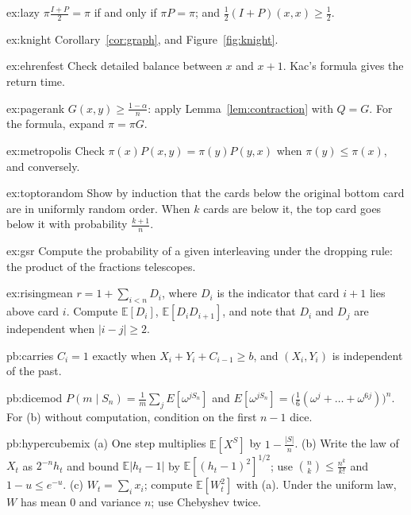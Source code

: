 \begin{hint}{ex:lazy}
$\pi\frac{I+P}2=\pi$ if and only if $\pi P=\pi$; and $\frac12(I+P)(x,x)\ge\frac12$.
\end{hint}
\begin{hint}{ex:knight}
Corollary~\ref{cor:graph}, and Figure~\ref{fig:knight}.
\end{hint}
\begin{hint}{ex:ehrenfest}
Check detailed balance between $x$ and $x+1$. Kac's formula gives the return time.
\end{hint}
\begin{hint}{ex:pagerank}
$G(x,y)\ge\frac{1-\alpha}n$: apply Lemma~\ref{lem:contraction} with $Q=G$. For the formula, expand $\pi=\pi G$.
\end{hint}
\begin{hint}{ex:metropolis}
Check $\pi(x)P(x,y)=\pi(y)P(y,x)$ when $\pi(y)\le\pi(x)$, and conversely.
\end{hint}
\begin{hint}{ex:toptorandom}
Show by induction that the cards below the original bottom card are in uniformly random order. When $k$ cards are below
it, the top card goes below it with probability $\frac{k+1}n$.
\end{hint}
\begin{hint}{ex:gsr}
Compute the probability of a given interleaving under the dropping rule: the product of the fractions telescopes.
\end{hint}
\begin{hint}{ex:risingmean}
$r=1+\sum_{i<n}D_i$, where $D_i$ is the indicator that card $i+1$ lies above card $i$. Compute $\mathbb E[D_i]$, $\mathbb E[D_iD_{i+1}]$, and note that $D_i$ and $D_j$ are
independent when $|i-j|\ge2$.
\end{hint}

\begin{hint}{pb:carries}
$C_i=1$ exactly when $X_i+Y_i+C_{i-1}\ge b$, and $(X_i,Y_i)$ is independent of the past.
\end{hint}

\begin{hint}{pb:dicemod}
$P(m\mid S_n)=\frac1m\sum_{j}E[\omega^{jS_n}]$ and $E[\omega^{jS_n}]=\bigl(\frac16(\omega^j+\dots+\omega^{6j})\bigr)^n$. For
(b) without computation, condition on the first $n-1$ dice.
\end{hint}

\begin{hint}{pb:hypercubemix}
(a) One step multiplies $\mathbb E[X^S]$ by $1-\frac{|S|}n$. (b) Write the law of $X_t$ as $2^{-n}h_t$ and bound $\mathbb E|h_t-1|$ by $\mathbb E[(h_t-1)^2]^{1/2}$; use
$\binom nk\le\frac{n^k}{k!}$ and $1-u\le e^{-u}$. (c) $W_t=\sum_ix_i$; compute $\mathbb E[W_t^2]$ with (a). Under the uniform law, $W$ has mean $0$ and variance
$n$; use Chebyshev twice.
\end{hint}

